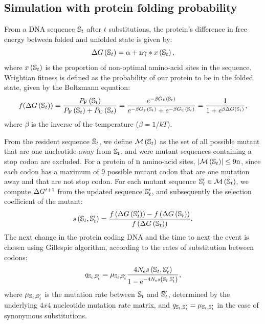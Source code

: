 \documentclass{article}
\begin{document}
\subsection{Simulation with protein folding probability}
\label{MatMet:folding}
From a DNA sequence $\mathbb{S}_{t}$ after $t$ substitutions, the protein's difference in free energy between folded and unfolded state is given by:
\begin{equation*}
\Delta G\left(\mathbb{S}_{t}\right) = \alpha + \text{n} \gamma * x\left(\mathbb{S}_{t}\right), 
\end{equation*}
where $x\left(\mathbb{S}_{t}\right)$ is the proportion of non-optimal amino-acid sites in the sequence.
Wrightian fitness is defined as the probability of our protein to be in the folded state, given by the Boltzmann equation: 
\begin{equation}
f(\Delta G\left(\mathbb{S}_{t}\right)) = \dfrac{P_{\mathrm{F}}\left(\mathbb{S}_{t}\right)}{P_{\mathrm{F}}\left(\mathbb{S}_{t}\right) + P_{\mathrm{U}}\left(\mathbb{S}_{t}\right)} = \dfrac{e^{-\beta G_{\mathrm{F}}\left(\mathbb{S}_{t}\right) }}{e^{-\beta G_{\mathrm{F}} \left(\mathbb{S}_{t}\right) } + e^{-\beta G_{\mathrm{U}}\left(\mathbb{S}_{t}\right) }} = \dfrac{1}{1 + e^{\beta \Delta G\left(\mathbb{S}_{t}\right) }}, 
\end{equation}
where $\beta$ is the inverse of the temperature ($\beta=1/kT$).

From the resident sequence $\mathbb{S}_{t}$, we define $\mathcal{M}\left(\mathbb{S}_{t}\right)$ as the set of all possible mutant that are one nucleotide away from $\mathbb{S}_{t}$, and were mutant sequences containing a stop codon are excluded.
For a protein of $\text{n}$ amino-acid sites, $\left| \mathcal{M}\left(\mathbb{S}_{t}\right) \right| \leq 9 \text{n}$, since each codon has a maximum of $9$ possible mutant codon that are one mutation away and that are not stop codon.
For each mutant sequence $\mathbb{S}_{t}' \in \mathcal{M}\left(\mathbb{S}_{t}\right)$, we compute $\Delta G^{t+1}$ from the updated sequence $\mathbb{S}_{t}'$, and subsequently the selection coefficient of the mutant:
\begin{equation}
s \left( \mathbb{S}_{t},\mathbb{S}_{t}'\right) = \dfrac{ f\left( \Delta G \left(\mathbb{S}_{t}'\right) \right) - f\left( \Delta G \left(\mathbb{S}_{t}\right) \right)}{f\left( \Delta G \left(\mathbb{S}_{t}\right) \right)}.
\end{equation}
The next change in the protein coding DNA and the time to next the event is chosen using Gillespie algorithm, according to the rates of substitution between codons:
\begin{equation}
q_{\mathbb{S}_{t}, \mathbb{S}_{t}'} = \mu_{\mathbb{S}_{t}, \mathbb{S}_{t}'} \dfrac{4 N_{\mathrm{e}} s \left( \mathbb{S}_{t},\mathbb{S}_{t}'\right)}{1 - \mathrm{e}^{-4 N_{\mathrm{e}} s \left( \mathbb{S}_{t},\mathbb{S}_{t}'\right)}}, 
\end{equation}
where $\mu_{\mathbb{S}_{t}, \mathbb{S}_{t}'}$ is the mutation rate between $\mathbb{S}_{t}$ and $\mathbb{S}_{t}'$, determined by the underlying $4x4$ nucleotide mutation rate matrix, and ${q_{\mathbb{S}_{t}, \mathbb{S}_{t}'}} = \mu_{\mathbb{S}_{t}, \mathbb{S}_{t}'}$ in the case of synonymous substitutions.
\end{document}
